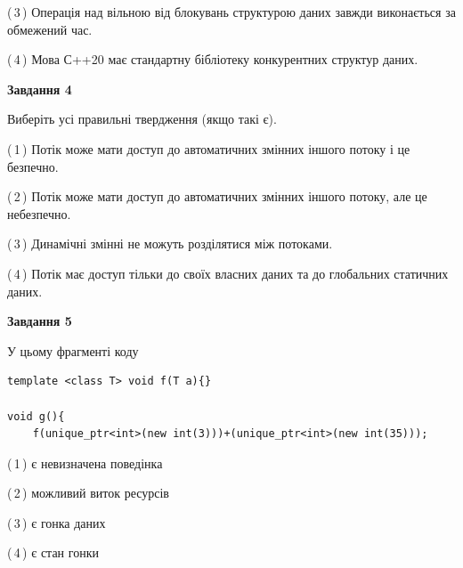 \documentclass[12pt, ukrainian]{article}
\begin{document}
\begin {large}
{(\,3\,) Операція над вільною від блокувань структурою даних завжди виконається за обмежений час.%

(\,4\,) Мова С++20 має стандартну бібліотеку конкурентних структур даних.%



\begin{center}
\textbf{Завдання 4}
\end{center}
Виберіть усі правильні твердження (якщо такі є).\par
\vspace{2mm}

(\,1\,) Потік може мати доступ до автоматичних змінних іншого потоку і це безпечно.%

(\,2\,) Потік може мати доступ до автоматичних змінних іншого потоку, але це небезпечно.%

(\,3\,) Динамічні змінні не можуть розділятися між потоками.%

(\,4\,) Потік має доступ тільки до своїх власних даних та до глобальних статичних даних.%



\begin{center}
\textbf{Завдання 5}
\end{center}
У цьому фрагменті коду
\begin{verbatim}
template <class T> void f(T a){}

void g(){
    f(unique_ptr<int>(new int(3)))+(unique_ptr<int>(new int(35)));
\end{verbatim}

(\,1\,) є невизначена поведінка%

(\,2\,) можливий виток ресурсів%

(\,3\,) є гонка даних%

(\,4\,) є стан гонки%


}
\end {large}
\end{document}
